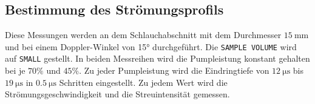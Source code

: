 \subsection{Bestimmung des Strömungsprofils}
Diese Messungen werden an dem Schlauchabschnitt mit dem Durchmesser $\SI{15}{\milli\meter}$ und bei einem Doppler-Winkel von 15° durchgeführt. Die \texttt{SAMPLE VOLUME} wird auf \texttt{SMALL}
gestellt. In beiden Messreihen wird die Pumpleistung konstant gehalten bei je $70\%$ und $45\%$. Zu jeder Pumpleistung wird die Eindringtiefe von $\SI{12}{\micro\second}$ bis $\SI{19}{\micro\second}$
in $\SI{0.5}{\micro\second}$ Schritten eingestellt. Zu jedem Wert wird die Strömungsgeschwindigkeit und die Streuintensität gemessen.